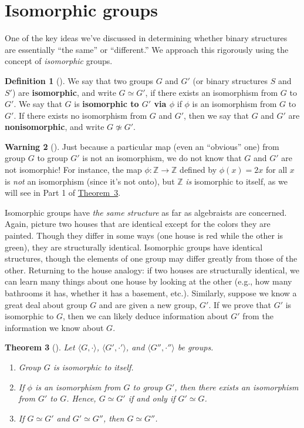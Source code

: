 \documentclass[10pt,]{book}
\newcommand{\terminology}[1]{\textbf{#1}}
\theoremstyle{plain}
\newtheorem{theorem}{Theorem}[section]
\theoremstyle{definition}
\newtheorem{definition}[theorem]{Definition}
\theoremstyle{definition}
\newtheorem{warning}[theorem]{Warning}
\theoremstyle{definition}
\theoremstyle{definition}
\numberwithin{equation}{section}
\def\Z{\mathbb{Z}}
\begin{document}
\section[{Isomorphic groups}]{Isomorphic groups}\label{section-12}
One of the key ideas we've discussed in determining whether binary structures are essentially ``the same'' or ``different.'' We approach this rigorously using the concept of \emph{isomorphic} groups.%
\begin{definition}[{}]\label{definition-33}
We say that two groups \(G\) and \(G'\) (or binary structures \(S\) and \(S'\)) are \terminology{isomorphic}, and write \(G\simeq G'\), if there exists an isomorphism from \(G\) to \(G'\). We say that \(G\) is \terminology{isomorphic to \(G'\) via \(\phi\)} if \(\phi\) is an isomorphism from \(G\) to \(G'\). If there exists no isomorphism from \(G\) and \(G'\), then we say that \(G\) and \(G'\) are \terminology{nonisomorphic}, and write \(G\not\simeq G'\).%
\end{definition}
\begin{warning}[]\label{warning-12}
Just because a particular map (even an ``obvious'' one) from group \(G\) to group \(G'\) is not an isomorphism, we do not know that \(G\) and \(G'\) are not isomorphic! For instance, the map \(\phi: \Z\to \Z\) defined by \(\phi(x)=2x\) for all \(x\) is \emph{not} an isomorphism (since it's not onto), but \(\Z\) \emph{is} isomorphic to itself, as we will see in Part 1 of \hyperref[groupisoequiv]{Theorem~3}.%
\end{warning}
Isomorphic groups have \emph{the same structure} as far as algebraists are concerned. Again, picture two houses that are identical except for the colors they are painted. Though they differ in some ways (one house is red while the other is green), they are structurally identical. Isomorphic groups have identical structures, though the elements of one group may differ greatly from those of the other. Returning to the house analogy: if two houses are structurally identical, we can learn many things about one house by looking at the other (e.g., how many bathrooms it has, whether it has a basement, etc.). Similarly, suppose we know a great deal about group \(G\) and are given a new group, \(G'\). If we prove that \(G'\) is isomorphic to \(G\), then we can likely deduce information about \(G'\) from the information we know about \(G\).%
\begin{theorem}[{}]\label{groupisoequiv}
Let \(\langle G,\cdot\rangle\), \(\langle G',\cdot'\rangle\), and \(\langle G'',\cdot''\rangle\) be groups. \leavevmode%
\begin{enumerate}
\item\hypertarget{li-144}{}Group \(G\) is isomorphic to itself.%
\item\hypertarget{li-145}{}If \(\phi\) is an isomorphism from \(G\) to group \(G'\), then there exists an isomorphism from \(G'\) to \(G\). Hence, \(G\simeq G'\) if and only if \(G'\simeq G\).%
\item\hypertarget{li-146}{}If \(G\simeq G'\) and \(G'\simeq G''\), then \(G\simeq G''\).%
\end{enumerate}
%
\end{theorem}
\end{document}
